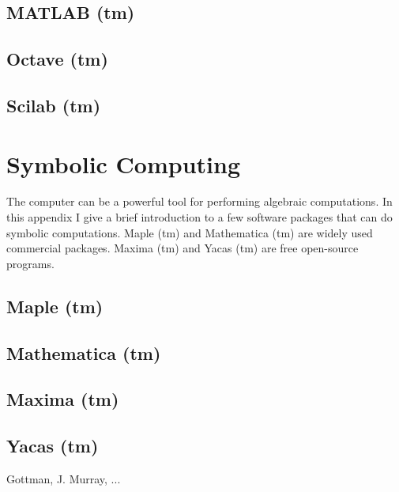 \documentclass{book}
\begin{document}
\section{MATLAB (tm)}
\section{Octave (tm)}
\section{Scilab (tm)}
\chapter{Symbolic Computing}
The computer can be a powerful tool for performing
algebraic computations.  In this appendix I give a brief introduction
to a few software packages that can do symbolic computations.
Maple (tm) and Mathematica (tm) are widely used commercial
packages.  Maxima (tm) and Yacas (tm) are free open-source
programs.
\section{Maple (tm)}
\section{Mathematica (tm)}
\section{Maxima (tm)}
\section{Yacas (tm)}
%
\begin{thebibliography}{99}
 Gottman, J. Murray, ...
\end{thebibliography}
\printindex
\end{document}
